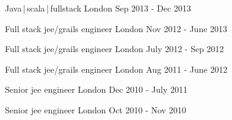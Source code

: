\begin{cventries}
    \cventry
    {Java\,|\,scala\,|\,fullstack}
    {} 
    {London}
    {Sep 2013 - Dec 2013}
    {}
    {}

    \cventry
    {Full stack jee/grails engineer}
    {} 
    {London}
    {Nov 2012 - June 2013}
    {}
    {}

    \cventry
    {Full stack jee/grails engineer}
    {} 
    {London}
    {July 2012 - Sep 2012}
    {}
    {}

    \cventry
    {Full stack jee/grails engineer}
    {} 
    {London}
    {Aug 2011 - June 2012}
    {}
    {}

    \cventry
    {Senior jee engineer}
    {} 
    {London}
    {Dec 2010 - July 2011}
    {}
    {}

    \cventry
    {Senior jee engineer}
    {} 
    {London}
    {Oct 2010 - Nov 2010}
    {}
    {}
\end{cventries}



